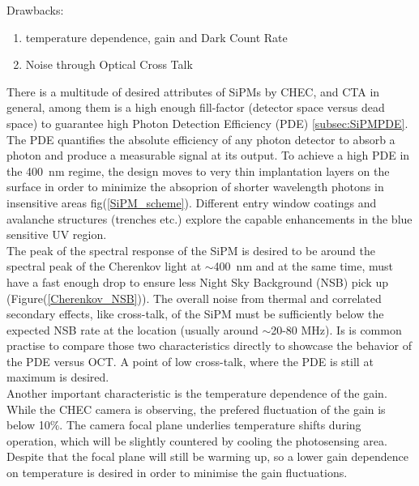 \documentclass[12pt,article,type=msc,colorback,accentcolor=tud9c]{tudthesis}
\begin{document}
\noindent
Drawbacks:
\begin{enumerate}[topsep=0pt,itemsep=-1ex,partopsep=1ex,parsep=1ex]
\item temperature dependence, gain and Dark Count Rate
\item Noise through Optical Cross Talk
\end{enumerate}
\noindent
\newline

There is a multitude of desired attributes of SiPMs by CHEC, and CTA in general, among them is a high enough fill-factor (detector space versus dead space) to guarantee high Photon Detection Efficiency (PDE) \ref{subsec:SiPMPDE}. The PDE quantifies the absolute efficiency of any photon detector to absorb a photon and produce a measurable signal at its output. To achieve a high PDE in the 400~nm regime, the design moves to very thin implantation layers on the surface in order to minimize the absoprion of shorter wavelength photons in insensitive areas fig(\ref{SiPM_scheme}). Different entry window coatings and avalanche structures (trenches etc.) explore the capable enhancements in the blue sensitive UV region.\\
The peak of the spectral response of the SiPM is desired to be around the spectral peak of the Cherenkov light at $\sim$400~nm and at the same time, must have a fast enough drop to ensure less Night Sky Background (NSB) pick up (Figure(\ref{Cherenkov_NSB})). The overall noise from thermal and correlated secondary effects, like cross-talk, of the SiPM must be sufficiently below the expected NSB rate at the location (usually around $\sim$20-80 MHz\cite{SiPMvsMAPMT}). Is is common practise to compare those two characteristics directly to showcase the behavior of the PDE versus OCT. A point of low cross-talk, where the PDE is still at maximum is desired.\\
Another important characteristic is the temperature dependence of the gain. While the CHEC camera is observing, the prefered fluctuation of the gain is below 10$\%$. The camera focal plane underlies temperature shifts during operation, which will be slightly countered by cooling the photosensing area. Despite that the focal plane will still be warming up, so a lower gain dependence on temperature is desired in order to minimise the gain fluctuations.
\end{document}
